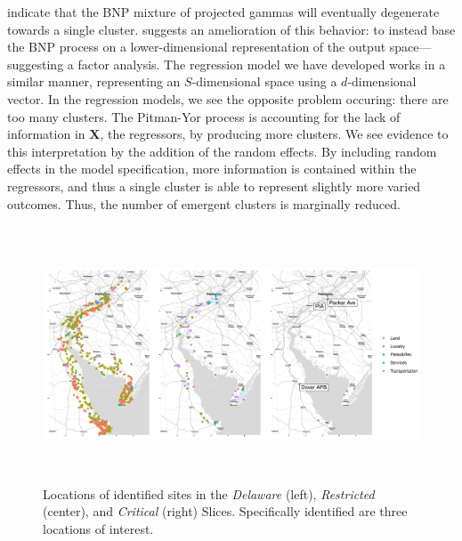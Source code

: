     indicate that the BNP mixture of projected gammas will eventually degenerate towards a 
    single cluster.
    \cite{chandra2023} suggests an amelioration of this behavior: to instead base the 
    BNP process on a lower-dimensional representation of the output space---suggesting 
    a factor analysis.  The regression model we have developed works in a similar manner, 
    representing an $S$-dimensional space using a $d$-dimensional vector.  In the regression
    models, we see the opposite problem occuring: there are too many clusters.  The Pitman-Yor
    process is accounting for the lack of information in $\bm{X}$, the regressors, by producing
    more clusters.  We see evidence to this interpretation by the addition of the random 
    effects.  By including random effects in the model specification, more information is 
    contained within the regressors, and thus a single cluster is able to represent slightly 
    more varied outcomes.  Thus, the number of emergent clusters is marginally reduced.

\begin{figure}[ht]
    \caption{Locations of identified sites in the \emph{Delaware} (left), 
    \emph{Restricted} (center), and \emph{Critical} (right) Slices.  Specifically 
    identified are three locations of interest.\label{map:delawarebay}}
    \centering
    \includegraphics[height=3in]{./plots/delaware}
\end{figure}

